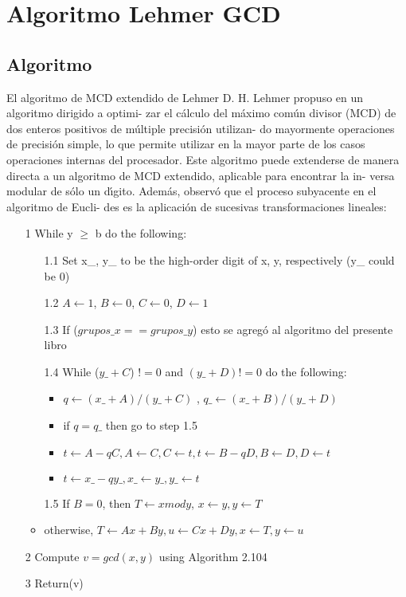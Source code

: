 \chapter{Algoritmo Lehmer GCD}

\section{Algoritmo}
El algoritmo de MCD extendido de Lehmer D. H.
Lehmer propuso en un algoritmo dirigido a optimi-
zar el cálculo del máximo común divisor (MCD) de
dos enteros positivos de múltiple precisión utilizan-
do mayormente operaciones de precisión simple, lo
que permite utilizar en la mayor parte de los casos
operaciones internas del procesador. Este algoritmo
puede extenderse de manera directa a un algoritmo
de MCD extendido, aplicable para encontrar la in-
versa modular de sólo un dı́gito. Además, observó
que el proceso subyacente en el algoritmo de Eucli-
des es la aplicación de sucesivas transformaciones
lineales:
\begin{itemize}
 \item[1] While y $\geq$ b do the following:
 \begin{itemize}
  \item[1.1] Set x\_, y\_ to be the high-order digit of x, y, respectively (y\_ could be 0)
  \item[1.2] $A\leftarrow1$, $B\leftarrow0$, $C\leftarrow0$, $D\leftarrow1$ 
  \item[1.3] If ($grupos\_x == grupos\_y$) esto se agregó al algoritmo del presente libro 
  \item[1.4] While ($y\_ + C$) $!= 0$ and $(y\_ + D)!= 0$ do the following:
  \begin{itemize}
   \item $q\leftarrow (x\_ + A)/(y\_ + C)$ , $q\_ \leftarrow (x\_ + B)/(y\_+ D)$ 
   \item if $q = q\_$ then go to step 1.5
   \item $t \leftarrow A-qC, A \leftarrow C, C \leftarrow t, t\leftarrow B - qD, B\leftarrow D, D\leftarrow t$ 
   \item $t\leftarrow x\_ - qy\_, x\_\leftarrow y\_, y\_\leftarrow t$
  \end{itemize}
  \item[1.5] If $B = 0$, then $T \leftarrow x mod y$, $x\leftarrow y, y\leftarrow T$ 
  \item otherwise, $T\leftarrow Ax + By, u\leftarrow Cx + Dy, x\leftarrow T , y\leftarrow u$ \\
 \end{itemize}
 \item[2] Compute $v = gcd(x, y)$ using Algorithm 2.104 
 \item[3] Return(v)
\end{itemize}

